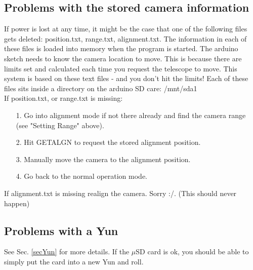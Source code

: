 \documentclass[11pt]{article}
\begin{document}
\subsection{Problems with the stored camera information}
If power is lost at any time, it might be the case that one of the following files gets deleted: position.txt, range.txt, alignment.txt. 
The information in each of these files is loaded into memory when the program is started.
The arduino sketch needs to know the camera location to move.
This is because there are limits set and calculated each time you request the telescope to move.
This system is based on these text files - and you don't hit the limits!
Each of these files sits inside a directory on the arduino SD care: /mnt/sda1\\[15pt]
If position.txt, or range.txt is missing:
\begin{enumerate}
\item[1.] Go into alignment mode if not there already and find the camera range (see "Setting Range" above).
\item[2.] Hit GETALGN to request the stored alignment position.
\item[3.] Manually move the camera to the alignment position.
\item[4.] Go back to the normal operation mode.
\end{enumerate}
If alignment.txt is missing realign the camera. Sorry :/. (This should never happen)

\subsection{Problems with a Yun}
See Sec. \ref{secYun} for more details.
If the $\mu$SD card is ok, you should be able to simply put the card into a new Yun and roll.
\end{document}
